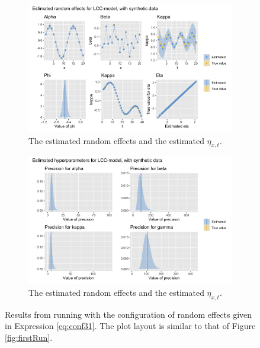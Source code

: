 \begin{figure}[h!]
    \centering
    \begin{subfigure}[b]{0.85\textwidth}
        \centering
        \includegraphics[width=\textwidth]{synthetic-data/Figures/effects-LCC-synthetic-3-1.png}
        \caption{The estimated random effects and the estimated $\eta_{x,t}$.}
        \label{fig:conf31-top}
    \end{subfigure}
    
    \begin{subfigure}[b]{0.6\textwidth}
        \centering
        \includegraphics[width=\textwidth]{synthetic-data/Figures/hyperparameters-LCC-synthetic-3-1.png}
        \caption{The estimated random effects and the estimated $\eta_{x,t}$.}
        \label{fig:conf31-bottom}
    \end{subfigure}
    \caption{Results from running \inlabru with the configuration of random effects given in Expression \ref{eq:conf31}. The plot layout is similar to that of Figure \ref{fig:firstRun}.}
    \label{fig:conf31}
\end{figure}

